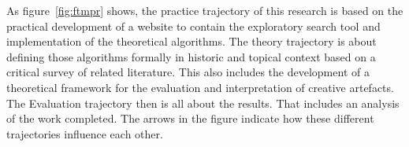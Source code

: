As figure~\ref{fig:ftmpr} shows, the practice trajectory of this research is based on the practical development of a website to contain the exploratory search tool and implementation of the theoretical algorithms. The theory trajectory is about defining those algorithms formally in historic and topical context based on a critical survey of related literature. This also includes the development of a theoretical framework for the evaluation and interpretation of creative artefacts. The Evaluation trajectory then is all about the results. That includes an analysis of the work completed. The arrows in the figure indicate how these different trajectories influence each other.


\stopcontents[chapters]
